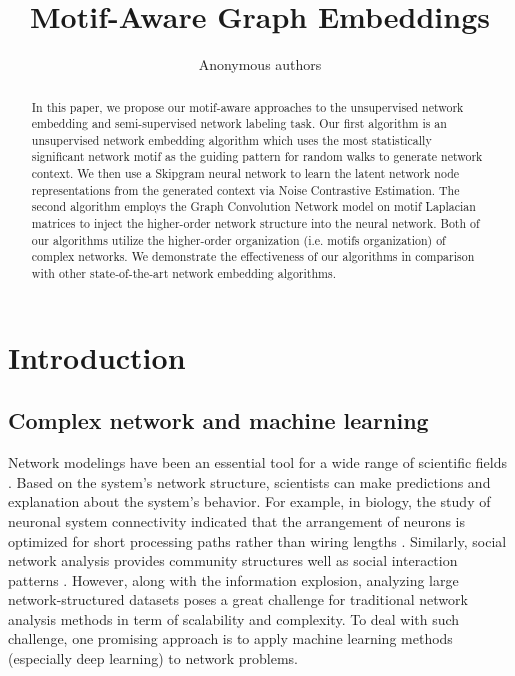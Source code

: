 \documentclass{article}
\title{Motif-Aware Graph Embeddings}
\author{Anonymous authors}
\theoremstyle{definition}
\begin{document}
\maketitle

\begin{abstract}

  In this paper, we propose our motif-aware approaches to the 
  unsupervised network embedding and semi-supervised network labeling 
  task. Our first algorithm is an unsupervised network embedding 
  algorithm which uses the most statistically significant network motif 
  as the guiding pattern for random walks to generate network context. We 
  then use a Skipgram neural network to learn the latent network node 
  representations from the generated context via Noise Contrastive 
  Estimation. The second algorithm employs the Graph Convolution Network 
  model on motif Laplacian matrices to inject the higher-order network 
  structure into the neural network. Both of our algorithms utilize the 
  higher-order organization (i.e. motifs organization) of complex 
  networks. We demonstrate the effectiveness of our algorithms in 
  comparison with other state-of-the-art network embedding algorithms.

\end{abstract}

\section{Introduction}

\subsection{Complex network and machine learning}

Network modelings have been an essential tool for a wide
range of scientific fields
\cite{physicnet,molecule,motifblockmilo,juremotif}. 
Based on the system's network structure, 
scientists can make predictions and explanation
about the system's behavior. For example, in biology, the
study of neuronal system connectivity indicated
that the arrangement of neurons is optimized
for short processing paths rather than wiring lengths
\cite{kaiser2006nonoptimal}. Similarly, social network
analysis provides community structures well as 
social interaction patterns 
\cite{west2014exploiting,barabasi2014network}. 
However, along with the information explosion, analyzing
large network-structured datasets poses a great challenge 
for traditional network analysis methods in term of 
scalability and complexity. To deal with such challenge,
one promising approach is to apply machine learning methods 
(especially deep learning) to network problems.
\end{document}
